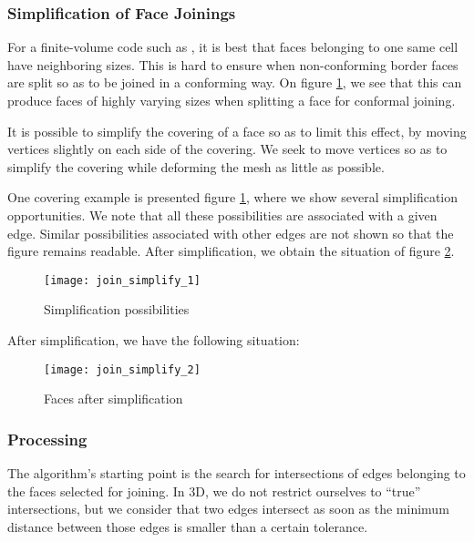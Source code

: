 \subsubsection*{Simplification of Face Joinings\label{sec:join.simplif}}

For a finite-volume code such as \CS, it is best that faces belonging
to one same cell have neighboring sizes. This is hard to ensure
when non-conforming border faces are split so as to be joined
in a conforming way. On figure \ref{fig:algo.join.simplif},
we see that this can produce faces of highly varying sizes
when splitting a face for conformal joining.

It is possible to simplify the covering of a face so as to limit
this effect, by moving vertices slightly on each side of the covering.
We seek to move vertices so as to simplify the covering while
deforming the mesh as little as possible.

One covering example is presented figure \ref{fig:algo.join.simplif},
where we show several simplification opportunities. We note that all
these possibilities are associated with a given edge. Similar
possibilities associated with other edges are not shown so that the
figure remains readable. After simplification, we obtain the
situation of figure \ref{fig:algo.join.simpl2}.

\begin{figure}[!h]
\centerline{
\texttt{[image: join\_simplify\_1]}}
\caption{Simplification possibilities}
\label{fig:algo.join.simplif}
\end{figure}

After simplification, we have the following situation:

\begin{figure}[!h]
\centerline{
\texttt{[image: join\_simplify\_2]}}
\caption{Faces after simplification}
\label{fig:algo.join.simpl2}
\end{figure}

\subsubsection*{Processing\label{sec:join.process}}

The algorithm's starting point is the search for intersections
of edges belonging to the faces selected for joining. In 3D, we
do not restrict ourselves to ``true'' intersections, but
we consider that two edges intersect as soon as the minimum
distance between those edges is smaller than a certain tolerance.

